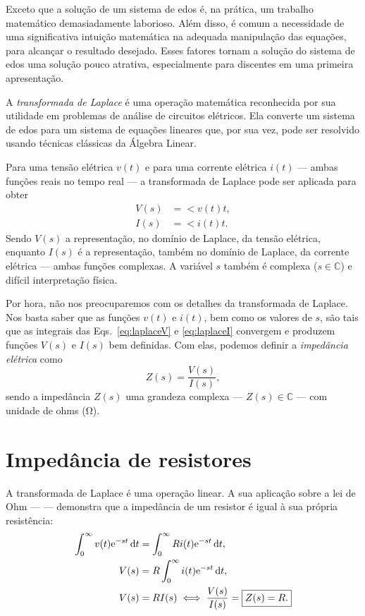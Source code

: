 Exceto que a solução de um sistema de \acp{edo} é, na prática, um trabalho matemático demasiadamente laborioso. Além disso, é comum a necessidade de uma significativa intuição matemática na adequada manipulação das equações, para alcançar o resultado desejado. Esses fatores tornam a solução do sistema de \acp{edo} uma solução pouco atrativa, especialmente para discentes em uma primeira apresentação.

A \emph{transformada de Laplace} é uma operação matemática reconhecida por sua utilidade em problemas de análise de circuitos elétricos. Ela converte um sistema de \acp{edo} para um sistema de equações lineares que, por sua vez, pode ser resolvido usando técnicas clássicas da Álgebra Linear.

Para uma tensão elétrica $v(t)$ e para uma corrente elétrica $i(t)$ --- ambas funções reais no tempo real --- a transformada de Laplace pode ser aplicada para obter
\begin{align}\label{eq:laplaceV}
	V(s)&=\lt{v(t)}{t},\\\label{eq:laplaceI}
	I(s)&=\lt{i(t)}{t}.
\end{align}
Sendo $V(s)$ a representação, no domínio de Laplace, da tensão elétrica, enquanto $I(s)$ é a representação, também no domínio de Laplace, da corrente elétrica --- ambas funções complexas. A variável $s$ também é complexa ($s\in\mathbb{C}$) e difícil interpretação física.

Por hora, não nos preocuparemos com os detalhes da transformada de Laplace. Nos basta saber que as funções $v(t)$ e $i(t)$, bem como os valores de $s$, são tais que as integrais das Eqs.~\eqref{eq:laplaceV} e \eqref{eq:laplaceI} convergem e produzem funções $V(s)$ e $I(s)$ bem definidas. Com elas, podemos definir a \emph{impedância elétrica} como
\begin{equation}
	Z(s)=\frac{V(s)}{I(s)},
\end{equation}
sendo a impedância $Z(s)$ uma grandeza complexa --- $Z(s)\in\mathbb{C}$ --- com unidade de ohms (\unit{\ohm}).

\section{Impedância de resistores}
A transformada de Laplace é uma operação linear. A sua aplicação sobre a lei de Ohm ---  --- demonstra que a impedância de um resistor é igual à sua própria resistência:
\begin{align}
	\int_{0}^{\infty}v(t)\mathrm{e}^{-st}\,\mathrm{d}t&=\int_{0}^{\infty}Ri(t)\mathrm{e}^{-st}\,\mathrm{d}t,\notag\\
	V(s)&=R\int_{0}^{\infty}i(t)\mathrm{e}^{-st}\,\mathrm{d}t,\notag\\
	V(s)&=RI(s)\iff\frac{V(s)}{I(s)}=\boxed{Z(s)=R.}
\end{align}

